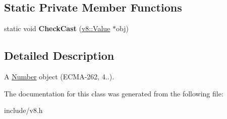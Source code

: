\subsection*{Static Private Member Functions}
\begin{DoxyCompactItemize}
\item 
static void {\bfseries Check\+Cast} (\hyperlink{classv8_1_1_value}{v8\+::\+Value} $\ast$obj)\hypertarget{classv8_1_1_number_object_a07cdd9c9e54d63844cfeb651b975d753}{}\label{classv8_1_1_number_object_a07cdd9c9e54d63844cfeb651b975d753}

\end{DoxyCompactItemize}


\subsection{Detailed Description}
A \hyperlink{classv8_1_1_number}{Number} object (E\+C\+M\+A-\/262, 4..). 

The documentation for this class was generated from the following file\+:\begin{DoxyCompactItemize}
\item 
include/v8.\+h\end{DoxyCompactItemize}
